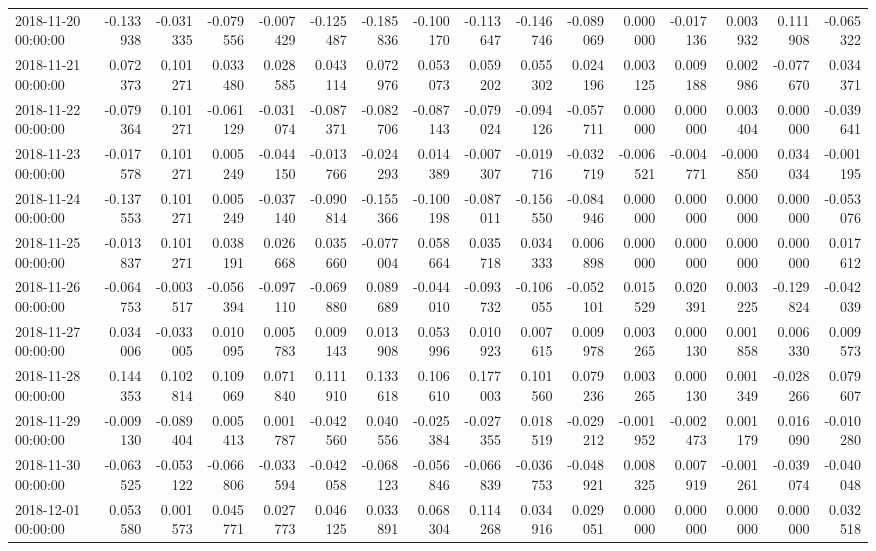 \begin{tabular}{lrrrrrrrrrrrrrrr}
2018-11-20 00:00:00 & -0.133938 & -0.031335 & -0.079556 & -0.007429 & -0.125487 & -0.185836 & -0.100170 & -0.113647 & -0.146746 & -0.089069 & 0.000000 & -0.017136 & 0.003932 & 0.111908 & -0.065322 \\
2018-11-21 00:00:00 & 0.072373 & 0.101271 & 0.033480 & 0.028585 & 0.043114 & 0.072976 & 0.053073 & 0.059202 & 0.055302 & 0.024196 & 0.003125 & 0.009188 & 0.002986 & -0.077670 & 0.034371 \\
2018-11-22 00:00:00 & -0.079364 & 0.101271 & -0.061129 & -0.031074 & -0.087371 & -0.082706 & -0.087143 & -0.079024 & -0.094126 & -0.057711 & 0.000000 & 0.000000 & 0.003404 & 0.000000 & -0.039641 \\
2018-11-23 00:00:00 & -0.017578 & 0.101271 & 0.005249 & -0.044150 & -0.013766 & -0.024293 & 0.014389 & -0.007307 & -0.019716 & -0.032719 & -0.006521 & -0.004771 & -0.000850 & 0.034034 & -0.001195 \\
2018-11-24 00:00:00 & -0.137553 & 0.101271 & 0.005249 & -0.037140 & -0.090814 & -0.155366 & -0.100198 & -0.087011 & -0.156550 & -0.084946 & 0.000000 & 0.000000 & 0.000000 & 0.000000 & -0.053076 \\
2018-11-25 00:00:00 & -0.013837 & 0.101271 & 0.038191 & 0.026668 & 0.035660 & -0.077004 & 0.058664 & 0.035718 & 0.034333 & 0.006898 & 0.000000 & 0.000000 & 0.000000 & 0.000000 & 0.017612 \\
2018-11-26 00:00:00 & -0.064753 & -0.003517 & -0.056394 & -0.097110 & -0.069880 & 0.089689 & -0.044010 & -0.093732 & -0.106055 & -0.052101 & 0.015529 & 0.020391 & 0.003225 & -0.129824 & -0.042039 \\
2018-11-27 00:00:00 & 0.034006 & -0.033005 & 0.010095 & 0.005783 & 0.009143 & 0.013908 & 0.053996 & 0.010923 & 0.007615 & 0.009978 & 0.003265 & 0.000130 & 0.001858 & 0.006330 & 0.009573 \\
2018-11-28 00:00:00 & 0.144353 & 0.102814 & 0.109069 & 0.071840 & 0.111910 & 0.133618 & 0.106610 & 0.177003 & 0.101560 & 0.079236 & 0.003265 & 0.000130 & 0.001349 & -0.028266 & 0.079607 \\
2018-11-29 00:00:00 & -0.009130 & -0.089404 & 0.005413 & 0.001787 & -0.042560 & 0.040556 & -0.025384 & -0.027355 & 0.018519 & -0.029212 & -0.001952 & -0.002473 & 0.001179 & 0.016090 & -0.010280 \\
2018-11-30 00:00:00 & -0.063525 & -0.053122 & -0.066806 & -0.033594 & -0.042058 & -0.068123 & -0.056846 & -0.066839 & -0.036753 & -0.048921 & 0.008325 & 0.007919 & -0.001261 & -0.039074 & -0.040048 \\
2018-12-01 00:00:00 & 0.053580 & 0.001573 & 0.045771 & 0.027773 & 0.046125 & 0.033891 & 0.068304 & 0.114268 & 0.034916 & 0.029051 & 0.000000 & 0.000000 & 0.000000 & 0.000000 & 0.032518 \\

\end{tabular}
